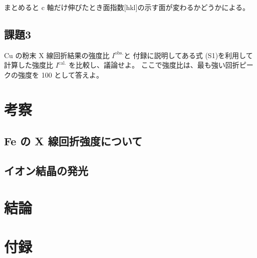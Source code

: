 \documentclass[11pt,dvipdfmx,a4paper]{jsarticle}
\begin{document}
まとめると c 軸だけ伸びたとき面指数[hkl]の示す面が変わるかどうかによる。

\subsection*{課題3}
Cu の粉末 X 線回折結果の強度比 \(I^{\text{obs.}}\)と
付録に説明してある式 (S1)を利用して計算した強度比 \(I^{\text{cal.}}\)
を比較し、議論せよ。
ここで強度比は、最も強い回折ピークの強度を 100 として答えよ。

\section{考察}
\subsection{Fe の X 線回折強度について}


\subsection{イオン結晶の発光}


\section{結論}



\section*{付録}
\end{document}
